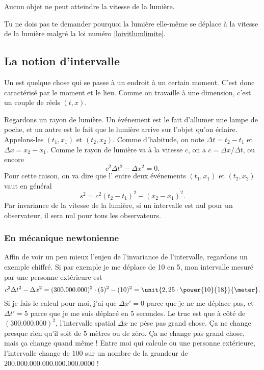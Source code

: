\begin{loiphyz}\label{loivitlumlimite}
Aucun objet ne peut atteindre la vitesse de la lumière.
\end{loiphyz}

\begin{loiphyz}
Tu ne dois pas te demander pourquoi la lumière elle-même se déplace à la vitesse de la lumière malgré la loi numéro \ref{loivitlumlimite}.
\end{loiphyz}

\subsection{La notion d'intervalle}


Un  est quelque chose qui se passe à un endroit à un certain moment. C'est donc caractérisé par le moment et le lieu. Comme on travaille à une dimension, c'est un couple de réels $(t,x)$. 

Regardons un rayon de lumière. Un événement est le fait d'allumer une lampe de poche, et un autre est le fait que le lumière arrive sur l'objet qu'on éclaire. Appelons-les $(t_1,x_1)$ et $(t_2,x_2)$. Comme d'habitude, on note $\Delta t=t_2-t_1$ et $\Delta x=x_2-x_1$. Comme le rayon de lumière va à la vitesse $c$, on a $c=\Delta x/\Delta t$, ou encore
\[ 
  c^2\Delta t^2-\Delta x^2=0.
\]
Pour cette raison, on va dire que l' entre deux événements $(t_1,x_1)$ et $(t_2,x_2)$ vaut en général
\begin{equation}
 s^2=c^2(t_2-t_1)^2-(x_2-x_1)^2.
\end{equation}
Par invariance de la vitesse de la lumière, si un intervalle est nul pour un observateur, il sera nul pour tous les observateurs.


\subsubsection{En mécanique newtonienne}

Affin de voir un peu mieux l'enjeu de l'invariance de l'intervalle, regardons un exemple chiffré.  Si par exemple je me déplace de \unit{10}{\meter} en \unit{5}{\second}, mon intervalle mesuré par une personne extérieure est
\[ 
  c^2\Delta t^2-\Delta x^2=(300.000.000)^2\cdot (5)^2 - (10)^2=\unit{2,25\cdot \power{10}{18}}{\meter}.
\]
Si je fais le calcul pour moi, j'ai que $\Delta x'=0$ parce que je ne me déplace pas, et $\Delta t'=5$ parce que je me suis déplacé en $5$ secondes. Le truc est que à côté de $(300.000.000)^2$, l'intervalle spatial $\Delta x$ ne pèse pas grand chose. Ça ne change presque rien qu'il soit de $5$ mètres ou de zéro. Ça ne change pas grand chose, mais ça change quand même ! Entre moi qui calcule ou une personne extérieure, l'intervalle change de $100$ sur un nombre de la grandeur de $200.000.000.000.000.000.0000$ !

